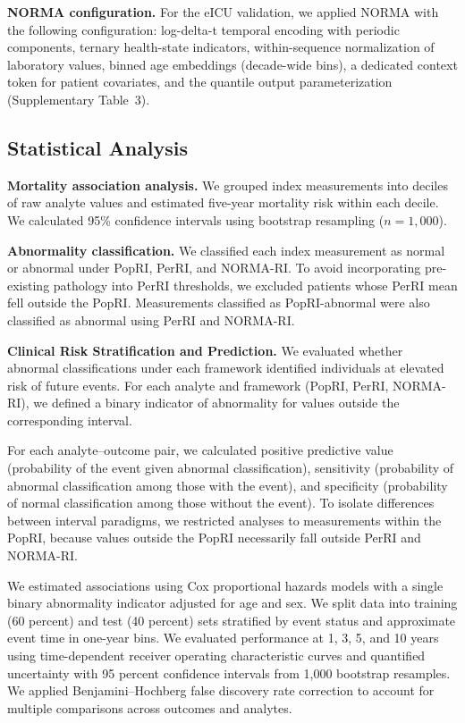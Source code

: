 \documentclass[11pt]{article}
\begin{document}
\textbf{NORMA configuration.} For the eICU validation, we applied NORMA with the following configuration: log-delta-t temporal encoding with periodic components, ternary health-state indicators, within-sequence normalization of laboratory values, binned age embeddings (decade-wide bins), a dedicated context token for patient covariates, and the quantile output parameterization (Supplementary Table~3).

\subsection*{Statistical Analysis}

\textbf{Mortality association analysis.} We grouped index measurements into deciles of raw analyte values and estimated five-year mortality risk within each decile. We calculated 95\% confidence intervals using bootstrap resampling ($n = 1{,}000$).

\textbf{Abnormality classification.} We classified each index measurement as normal or abnormal under PopRI, PerRI, and NORMA-RI. To avoid incorporating pre-existing pathology into PerRI thresholds, we excluded patients whose PerRI mean fell outside the PopRI. Measurements classified as PopRI-abnormal were also classified as abnormal using PerRI and NORMA-RI.

\textbf{Clinical Risk Stratification and Prediction.} We evaluated whether abnormal classifications under each framework identified individuals at elevated risk of future events. For each analyte and framework (PopRI, PerRI, NORMA-RI), we defined a binary indicator of abnormality for values outside the corresponding interval.

For each analyte--outcome pair, we calculated positive predictive value (probability of the event given abnormal classification), sensitivity (probability of abnormal classification among those with the event), and specificity (probability of normal classification among those without the event). To isolate differences between interval paradigms, we restricted analyses to measurements within the PopRI, because values outside the PopRI necessarily fall outside PerRI and NORMA-RI.

We estimated associations using Cox proportional hazards models with a single binary abnormality indicator adjusted for age and sex. We split data into training (60 percent) and test (40 percent) sets stratified by event status and approximate event time in one-year bins. We evaluated performance at 1, 3, 5, and 10 years using time-dependent receiver operating characteristic curves and quantified uncertainty with 95 percent confidence intervals from 1,000 bootstrap resamples. We applied Benjamini--Hochberg false discovery rate correction to account for multiple comparisons across outcomes and analytes.
\end{document}
